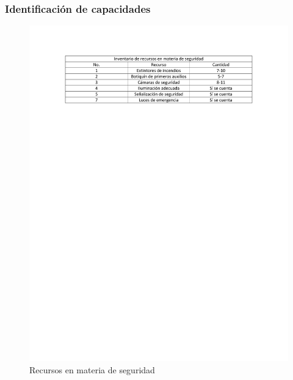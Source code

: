     \subsubsection{Identificación de capacidades}
    \begin{figure}[H]
        \centering
        \includegraphics[trim = {0mm 90mm 0mm 20mm},clip,scale=0.4]{3/Img/inventarioDeRecursos.pdf}
        \caption{Recursos en materia de seguridad} 
        \label{fig:Recursos en materia de seguridad}
    \end{figure}

